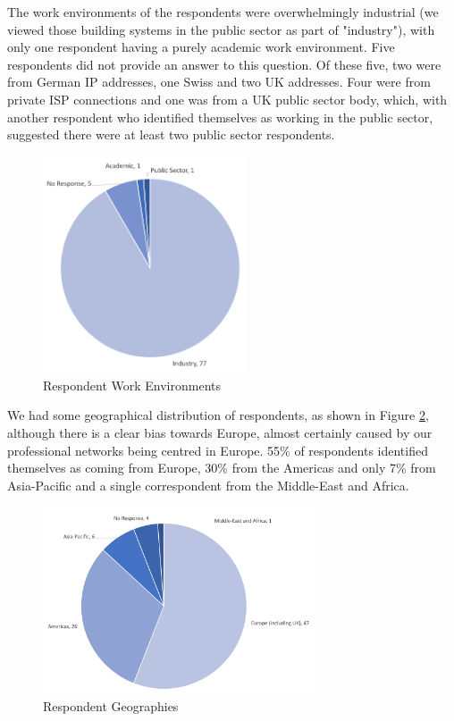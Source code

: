 The work environments of the respondents were overwhelmingly industrial (we viewed those building systems in the public sector as part of "industry"), with only one respondent having a purely academic work environment.  Five respondents did not provide an answer to this question.  Of these five, two were from German IP addresses, one Swiss and two UK addresses.  Four were from private ISP connections and one was from a UK public sector body, which, with another respondent who identified themselves as working in the public sector, suggested there were at least two public sector respondents.
 
\begin{figure}
\centering
\includegraphics[width=6cm,trim={2 2 2 2},clip]{Figures/prioritisation-workenv}
\caption{Respondent Work Environments}
\label{figure:workenvs}
\end{figure}

We had some geographical distribution of respondents, as shown in Figure \ref{figure:geographies}, although there is a clear bias towards Europe, almost certainly caused by our professional networks being centred in Europe.  55\% of respondents identified themselves as coming from Europe, 30\% from the Americas and only 7\% from Asia-Pacific and a single correspondent from the Middle-East and Africa.

\begin{figure}
\centering
\includegraphics[width=8cm,trim={2 2 2 2},clip]{Figures/prioritisation-regions}
\caption{Respondent Geographies}
\label{figure:geographies}
\end{figure}

